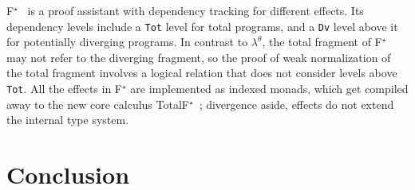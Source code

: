 \documentclass{article}
\newcommand{\code}[1]{\texttt{#1}}
\begin{document}
F$^\star$~\citep{fstar} is a proof assistant with dependency tracking for different effects.
Its dependency levels include a \code{Tot} level for total programs,
and a \code{Dv} level above it for potentially diverging programs.
In contrast to $\lambda^\theta$,
the total fragment of F$^\star$ may not refer to the diverging fragment,
so the proof of weak normalization of the total fragment
involves a logical relation that does not consider levels above \code{Tot}.
All the effects in F$^\star$ are implemented as indexed monads,
which get compiled away to the new core calculus TotalF$^\star$~\citep{total-fstar};
divergence aside, effects do not extend the internal type system.

\section{Conclusion}

\noindent

\end{document}
